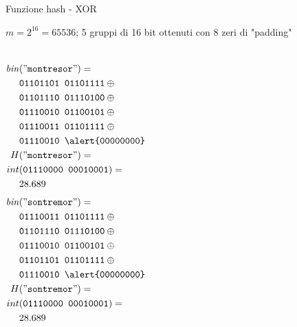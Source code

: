 \begin{frame}[shrink=5]{Funzione hash - XOR}

\vspace{-6pt}
\begin{myboxtitle}[Esempio]
$m = 2^{16} = 65536$; 5 gruppi di 16 bit ottenuti con 8 zeri di "\alert{padding}"

\begin{columns}[T]
\begin{align*}
\mathit{bin}&("\texttt{montresor}") = \\ 
&\texttt{01101101 01101111}  \oplus {} \\
&\texttt{01101110 01110100} \oplus {} \\
&\texttt{01110010 01100101} \oplus {} \\
&\texttt{01110011 01101111} \oplus {} \\
&\texttt{01110010 \alert{00000000}} \\
H&("\texttt{montresor}") = {}\\
int&(\texttt{01110000 00010001}) = {}\\
& 28.689 
\end{align*}
\begin{align*}
\mathit{bin}&("\texttt{sontremor}") = {} \\
&\texttt{01110011 01101111}  \oplus {} \\
&\texttt{01101110 01110100} \oplus {} \\
&\texttt{01110010 01100101} \oplus {} \\
&\texttt{01101101 01101111} \oplus {} \\
&\texttt{01110010 \alert{00000000}} \\
H&("\texttt{sontremor}") = {}\\
int&(\texttt{01110000 00010001}) = {}\\
& 28.689 
\end{align*}
\end{columns}

\end{myboxtitle}

\end{frame}


